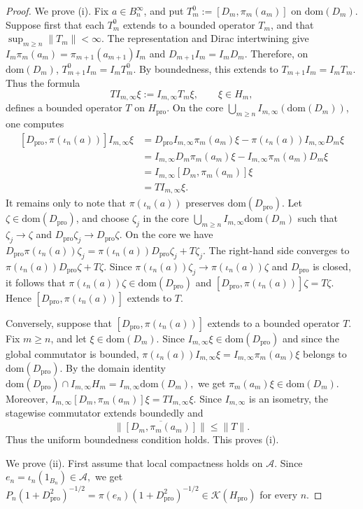 \documentclass[11pt]{amsart}
\theoremstyle{definition}
\theoremstyle{remark}
\newcommand{\ex}{\mathrm{pro}}
\newcommand{\dom}{\mathrm{dom}}
\begin{document}
\begin{proof}
We prove \textup{(i)}. Fix \(a\in B_n^\infty\), and put $T_m^0:=[D_m,\pi_m(a_m)]$
on $\dom (D_m)$. Suppose first that each $T_m^0$ extends to a bounded
operator $T_m$, and that $\sup_{m\ge n}\|T_m\|<\infty$. The representation
and Dirac intertwining give $I_m\pi_m(a_m)=\pi_{m+1}(a_{m+1})I_m$
and $D_{m+1}I_m=I_mD_m.$
Therefore, on $\dom (D_m)$, $T_{m+1}^0I_m=I_mT_m^0.$
By boundedness, this extends to $T_{m+1}I_m=I_mT_m.$
Thus the formula
\[
T I_{m,\infty}\xi:=I_{m,\infty}T_m\xi,
\qquad \xi\in H_m,
\]
defines a bounded operator $T$ on $H_{\ex}$. On the core
$\bigcup_{m\ge n}I_{m,\infty}(\dom (D_m))$, one computes
\[
\begin{aligned}
[D_{\ex},\pi(\iota_n(a))]I_{m,\infty}\xi
&=
D_{\ex}I_{m,\infty}\pi_m(a_m)\xi
-
\pi(\iota_n(a))I_{m,\infty}D_m\xi  \\
&=
I_{m,\infty}D_m\pi_m(a_m)\xi
-
I_{m,\infty}\pi_m(a_m)D_m\xi \\
&=
I_{m,\infty}[D_m,\pi_m(a_m)]\xi \\
&=
T I_{m,\infty}\xi.
\end{aligned}
\]
It remains only to note that $\pi(\iota_n(a))$ preserves
$\dom(D_{\ex})$. Let $\zeta\in\dom(D_{\ex})$, and choose
$\zeta_j$ in the core $\bigcup_{m\ge n}I_{m,\infty}\dom(D_m)$
such that $\zeta_j\to\zeta$ and $D_{\ex}\zeta_j\to D_{\ex}\zeta.$
On the core we have $D_{\ex}\pi(\iota_n(a))\zeta_j=\pi(\iota_n(a))D_{\ex}\zeta_j+T\zeta_j.$
The right-hand side converges to $\pi(\iota_n(a))D_{\ex}\zeta+T\zeta.$
Since $\pi(\iota_n(a))\zeta_j\to\pi(\iota_n(a))\zeta$ and
$D_{\ex}$ is closed, it follows that $\pi(\iota_n(a))\zeta\in\dom(D_{\ex})$
and $[D_{\ex},\pi(\iota_n(a))]\zeta=T\zeta.$ Hence $[D_{\ex},\pi(\iota_n(a))]$ extends to $T$.

Conversely, suppose that $[D_{\ex},\pi(\iota_n(a))]$ extends to a bounded
operator $T$. Fix $m\ge n$, and let $\xi\in\dom(D_m)$. Since $I_{m,\infty}\xi\in\dom(D_{\ex})$
and since the global commutator is bounded, $\pi(\iota_n(a))I_{m,\infty}\xi=I_{m,\infty}\pi_m(a_m)\xi$
belongs to $\dom(D_{\ex})$. By the domain identity $\dom(D_{\ex})\cap I_{m,\infty}H_m=I_{m,\infty}\dom(D_m),$
we get $\pi_m(a_m)\xi\in\dom(D_m).$
Moreover, $I_{m,\infty}[D_m,\pi_m(a_m)]\xi=T I_{m,\infty}\xi.$
Since $I_{m,\infty}$ is an isometry, the stagewise commutator extends
boundedly and \[\|\overline{[D_m,\pi_m(a_m)]}\|\leq \|T\|.\]
Thus the uniform boundedness condition holds. This proves \textup{(i)}.

We prove \textup{(ii)}. First assume that local compactness holds on
$\mathcal A$. Since $e_n=\iota_n(1_{B_n})\in\mathcal A,$
we get $P_n(1+D_{\ex}^2)^{-1/2}=\pi(e_n)(1+D_{\ex}^2)^{-1/2}\in\mathcal K(H_{\ex})$
for every $n$.


\end{proof}
\end{document}
